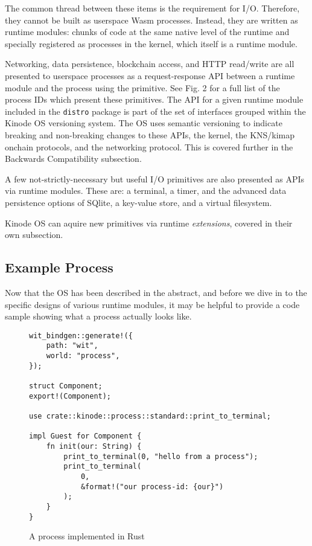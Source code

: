 \documentclass[runningheads]{llncs}
\begin{document}
The common thread between these items is the requirement for I/O.
Therefore, they cannot be built as userspace Wasm processes.
Instead, they are written as runtime modules: chunks of code at the same native level of the runtime and specially registered as processes in the kernel, which itself is a runtime module.

Networking, data persistence, blockchain access, and HTTP read/write are all presented to userspace processes as a request-response API between a runtime module and the process using the primitive.
See Fig. 2 for a full list of the process IDs which present these primitives.
The API for a given runtime module included in the \verb|distro| package is part of the set of interfaces grouped within the Kinode OS versioning system.
The OS uses semantic versioning to indicate breaking and non-breaking changes to these APIs, the kernel, the KNS/kimap onchain protocols, and the networking protocol.
This is covered further in the Backwards Compatibility subsection.

A few not-strictly-necessary but useful I/O primitives are also presented as APIs via runtime modules.
These are: a terminal, a timer, and the advanced data persistence options of SQlite, a key-value store, and a virtual filesystem.

Kinode OS can aquire new primitives via runtime \textit{extensions}, covered in their own subsection.

\subsection{Example Process}

Now that the OS has been described in the abstract, and before we dive in to the specific designs of various runtime modules, it may be helpful to provide a code sample showing what a process actually looks like.

\begin{figure}
\begin{lstlisting}
wit_bindgen::generate!({
    path: "wit",
    world: "process",
});

struct Component;
export!(Component);

use crate::kinode::process::standard::print_to_terminal;

impl Guest for Component {
    fn init(our: String) {
        print_to_terminal(0, "hello from a process");
        print_to_terminal(
            0,
            &format!("our process-id: {our}")
        );
    }
}
\end{lstlisting}
    \caption{A process implemented in Rust}
    \label{fig:example process}
\end{figure}
\end{document}
